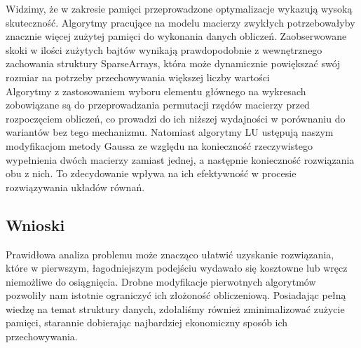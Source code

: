 \documentclass{article}
\begin{document}
	Widzimy, że w zakresie pamięci przeprowadzone optymalizacje wykazują wysoką skuteczność. Algorytmy pracujące na modelu macierzy zwykłych potrzebowałyby znacznie więcej zużytej pamięci do wykonania danych obliczeń. Zaobserwowane skoki w ilości zużytych bajtów wynikają prawdopodobnie z wewnętrznego zachowania struktury SparseArrays, która może dynamicznie powiększać swój rozmiar na potrzeby przechowywania większej liczby wartości\\


	Algorytmy z zastosowaniem wyboru elementu głównego na wykresach zobowiązane są do przeprowadzania permutacji rzędów macierzy przed rozpoczęciem obliczeń, co prowadzi do ich niższej wydajności w porównaniu do wariantów bez tego mechanizmu. Natomiast algorytmy LU ustępują naszym modyfikacjom metody Gaussa ze względu na konieczność rzeczywistego wypełnienia dwóch macierzy zamiast jednej, a następnie konieczność rozwiązania obu z nich. To zdecydowanie wpływa na ich efektywność w procesie rozwiązywania układów równań.

\subsection*{Wnioski}
	Prawidłowa analiza problemu może znacząco ułatwić uzyskanie rozwiązania, które w pierwszym, łagodniejszym podejściu wydawało się kosztowne lub wręcz niemożliwe do osiągnięcia. Drobne modyfikacje pierwotnych algorytmów pozwoliły nam istotnie ograniczyć ich złożoność obliczeniową. Posiadając pełną wiedzę na temat struktury danych, zdołaliśmy również zminimalizować zużycie pamięci, starannie dobierając najbardziej ekonomiczny sposób ich przechowywania.
\end{document}
